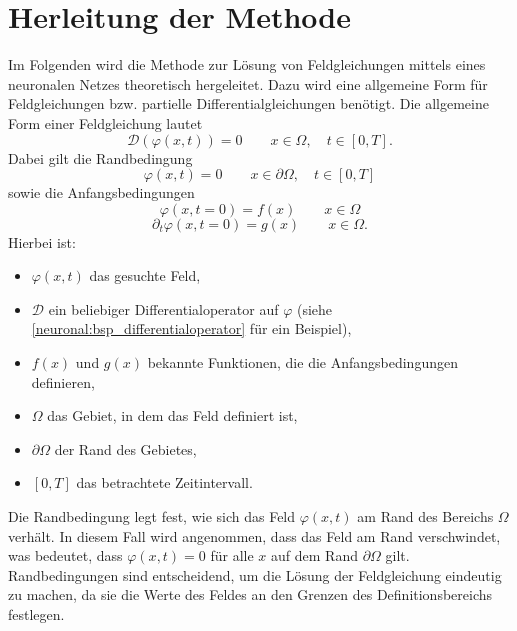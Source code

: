 %
%
%
%

\section{Herleitung der Methode\label{neuronal:section:herleitung}}

Im Folgenden wird die Methode zur Lösung von Feldgleichungen mittels eines neuronalen Netzes theoretisch hergeleitet.
Dazu wird eine allgemeine Form für Feldgleichungen bzw. partielle Differentialgleichungen benötigt.
Die allgemeine Form einer Feldgleichung lautet
\begin{equation}
\mathcal{D}(\varphi(x, t)) = 0 \qquad x \in \Omega, \quad t \in [0,T].
\label{neuronal:generelle_feldgleichung}
\end{equation}
Dabei gilt die Randbedingung
\begin{equation}
\varphi(x, t) = 0 \qquad x \in \partial \Omega, \quad t \in [0,T]
\end{equation}
sowie die Anfangsbedingungen
\begin{equation}
\varphi(x, t = 0) = f(x) \qquad x \in \Omega 
\label{neuronal:anfangsbedingung_voll}
\end{equation}
\begin{equation}
\partial_t \varphi(x, t = 0) = g(x) \qquad x \in \Omega.
\label{neuronal:anfangsbedingung_partiel}
\end{equation}
Hierbei ist:
\begin{itemize}
    \item $\varphi(x, t)$ das gesuchte Feld,
    \item $\mathcal{D}$ ein beliebiger Differentialoperator auf $\varphi$ (siehe \eqref{neuronal:bsp_differentialoperator} für ein Beispiel),
    \item $f(x)$ und $g(x)$ bekannte Funktionen, die die Anfangsbedingungen definieren,
    \item $\Omega$ das Gebiet, in dem das Feld definiert ist,
    \item $\partial \Omega$ der Rand des Gebietes,
    \item $[0,T]$ das betrachtete Zeitintervall.
\end{itemize}

Die Randbedingung legt fest, wie sich das Feld $\varphi(x, t)$ am Rand des Bereichs $\Omega$ verhält.
In diesem Fall wird angenommen, dass das Feld am Rand verschwindet, was bedeutet, dass $\varphi(x, t) = 0$ für alle $x$ auf dem Rand $\partial \Omega$ gilt.
Randbedingungen sind entscheidend, um die Lösung der Feldgleichung eindeutig zu machen, da sie die Werte des Feldes an den Grenzen des Definitionsbereichs festlegen.


